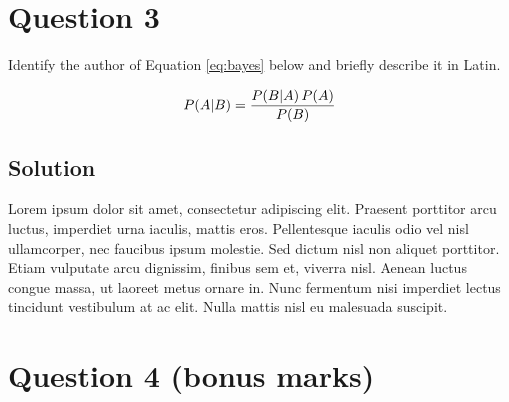 \documentclass[
  UTF8, %
  12pt, %
]{assigment}
\begin{document}

\section*{Question 3}

\begin{problem}
Identify the author of Equation \eqref{eq:bayes} below and briefly describe it in Latin.

\medskip

\begin{equation}\label{eq:bayes}
  P \qty( A \middle| B ) = \frac{ P \qty( B \middle| A ) \, P (A)}{P (B)}
\end{equation}

\smallskip
\end{problem}


\subsection*{Solution}

Lorem ipsum dolor sit amet, consectetur adipiscing elit. Praesent porttitor arcu luctus, imperdiet urna iaculis, mattis eros. Pellentesque iaculis odio vel nisl ullamcorper, nec faucibus ipsum molestie. Sed dictum nisl non aliquet porttitor. Etiam vulputate arcu dignissim, finibus sem et, viverra nisl. Aenean luctus congue massa, ut laoreet metus ornare in. Nunc fermentum nisi imperdiet lectus tincidunt vestibulum at ac elit. Nulla mattis nisl eu malesuada suscipit.


\section*{Question 4 (bonus marks)}
\end{document}
